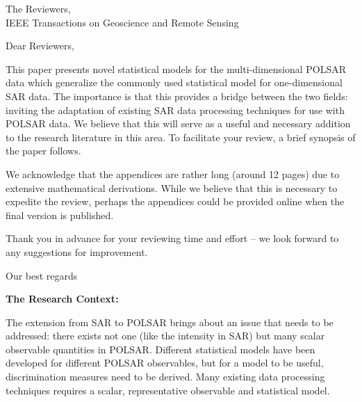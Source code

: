 \documentclass{letter}
\begin{document}
 
\begin{letter}{The Reviewers,\\IEEE Transactions on Geoscience and Remote Sensing}
\opening{Dear Reviewers,}





This paper presents novel statistical models for the multi-dimensional POLSAR data which generalize the commonly used statistical model for one-dimensional SAR data. The importance is that this provides a bridge between the two fields: inviting the adaptation of existing SAR data processing techniques for use with POLSAR data. We believe that this will serve as a useful and necessary addition to the research literature in this area.
To facilitate your review, a brief synopsis of the paper follows.

We acknowledge that the appendices are rather long (around 12 pages) due to extensive mathematical derivations. While we believe that this is necessary to expedite the review, perhaps the appendices could be provided online when the final version is published.

Thank you in advance for your reviewing time and effort -- we look forward to any suggestions for improvement.

\closing{Our best regards}


\newpage
\textbf{The Research Context:}

The extension from SAR to POLSAR brings about an issue that needs to be addressed:
  there exists not one (like the intensity in SAR) but many scalar observable quantities in POLSAR. 
Different statistical models have been developed for different POLSAR observables, 
 but for a model to be useful, discrimination measures need to be derived.
Many existing data processing techniques requires a scalar, representative observable and statistical model.


\end{letter}
\end{document}
